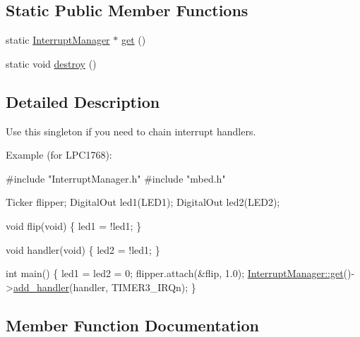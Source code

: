 \subsection*{Static Public Member Functions}
\begin{DoxyCompactItemize}
\item 
static \hyperlink{classmbed_1_1_interrupt_manager}{Interrupt\+Manager} $\ast$ \hyperlink{classmbed_1_1_interrupt_manager_a02c7c6ec7c6a1ce0ec82d85b7648d28c}{get} ()
\item 
static void \hyperlink{classmbed_1_1_interrupt_manager_a39fe3c021afee8a248309a2a6034b8df}{destroy} ()
\end{DoxyCompactItemize}


\subsection{Detailed Description}
Use this singleton if you need to chain interrupt handlers.

Example (for L\+P\+C1768)\+: 
\begin{DoxyCode}
\textcolor{preprocessor}{#include "InterruptManager.h"}
\textcolor{preprocessor}{#include "mbed.h"}

Ticker flipper;
DigitalOut led1(LED1);
DigitalOut led2(LED2);

\textcolor{keywordtype}{void} flip(\textcolor{keywordtype}{void}) \{
    led1 = !led1;
\}

\textcolor{keywordtype}{void} handler(\textcolor{keywordtype}{void}) \{
    led2 = !led1;
\}

\textcolor{keywordtype}{int} main() \{
    led1 = led2 = 0;
    flipper.attach(&flip, 1.0);
    \hyperlink{classmbed_1_1_interrupt_manager_a02c7c6ec7c6a1ce0ec82d85b7648d28c}{InterruptManager::get}()->\hyperlink{classmbed_1_1_interrupt_manager_a17e717ff89d096a000f674b46ca7e849}{add\_handler}(handler, TIMER3\_IRQn);
\}
\end{DoxyCode}
 

\subsection{Member Function Documentation}
